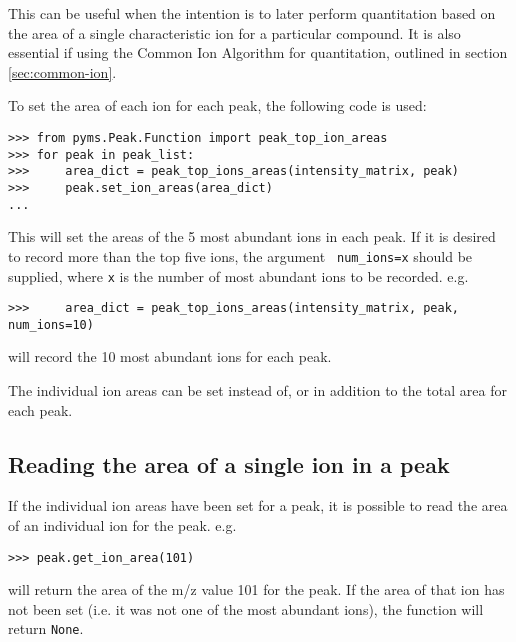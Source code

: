 This can be useful when the intention is to later perform quantitation
based on the area of a single characteristic ion for a particular
compound. It is also essential if using the Common Ion Algorithm for
quantitation, outlined in section \ref{sec:common-ion}.

To set the area of each ion for each peak, the following code is used:

\begin{verbatim}
>>> from pyms.Peak.Function import peak_top_ion_areas
>>> for peak in peak_list:
>>>     area_dict = peak_top_ions_areas(intensity_matrix, peak)
>>>     peak.set_ion_areas(area_dict)
...
\end{verbatim}

This will set the areas of the 5 most abundant ions in each peak. If
it is desired to record more than the top five ions, the argument {\tt
  num\_ions=x} should be supplied, where {\tt x} is the number of most
abundant ions to be recorded. e.g.
\begin{verbatim}
>>>     area_dict = peak_top_ions_areas(intensity_matrix, peak, num_ions=10)
\end{verbatim}
will record the 10 most abundant ions for each peak.

The individual ion areas can be set instead of, or in addition to the
total area for each peak.

\subsection{Reading the area of a single ion in a peak}

If the individual ion areas have been set for a peak, it is possible
to read the area of an individual ion for the peak. e.g.
\begin{verbatim}
>>> peak.get_ion_area(101)
\end{verbatim}
will return the area of the m/z value 101 for the peak. If the area of
that ion has not been set (i.e. it was not one of the most abundant
ions), the function will return {\tt None}.

